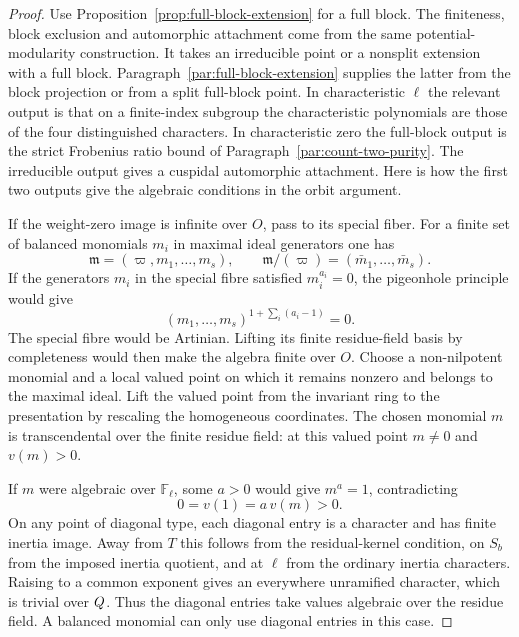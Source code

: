 \begin{proof}

Use Proposition~\ref{prop:full-block-extension} for a full block.
The finiteness, block exclusion and automorphic attachment
come from the same potential-modularity construction. It takes
an irreducible point or a nonsplit extension with a full block.
Paragraph~\ref{par:full-block-extension} supplies the latter from
the block projection or from a split full-block point. In
characteristic \(\ell\) the relevant output
is that on a finite-index subgroup the characteristic polynomials
are those of the four distinguished characters. In characteristic
zero the full-block output is the strict Frobenius ratio bound
of Paragraph~\ref{par:count-two-purity}.
The irreducible output gives a cuspidal automorphic attachment.
Here is how the first two outputs give the algebraic conditions
in the orbit argument.

If the weight-zero image is infinite over \(O\), pass to its
special fiber. For a finite set of balanced monomials \(m_i\) in maximal ideal generators one has
\[
 \mathfrak m=(\varpi,m_1,\ldots,m_s),\qquad \mathfrak m/(\varpi)=(\bar m_1,\ldots,\bar m_s).
\]
If the generators \(m_i\) in the special fibre satisfied \(m_i^{a_i}=0\), the pigeonhole principle would give
\[
 (m_1,\ldots,m_s)^{1+\sum_i(a_i-1)}=0 .
\]
The special fibre would be Artinian. Lifting its finite residue-field basis by completeness would then make the algebra finite over \(O\). Choose a non-nilpotent monomial and a local valued
point on which it remains nonzero and belongs to the maximal
ideal. Lift the valued point from the invariant ring to the presentation by rescaling the homogeneous coordinates. The chosen monomial \(m\) is transcendental over the finite
residue field: at this valued point \(m\ne0\) and \(v(m)>0\).

If \(m\) were algebraic over \(\mathbb F_\ell\), some \(a>0\) would
give \(m^a=1\), contradicting
\[
                      0=v(1)=a\,v(m)>0 .
\]
On any point of diagonal type, each diagonal entry is a
character and has finite inertia image. Away from \(T\) this
follows from the residual-kernel condition, on \(S_b\) from
the imposed inertia quotient, and at \(\ell\) from the
ordinary inertia characters. Raising to a common exponent
gives an everywhere unramified character, which is trivial
over \(Q\). Thus the diagonal entries take values algebraic
over the residue field. A balanced monomial can only use
diagonal entries in this case.


\end{proof}
